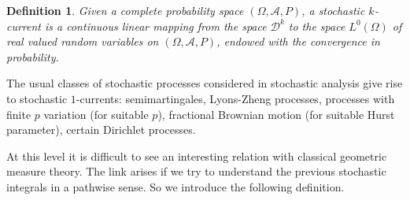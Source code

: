 \documentclass{article}
\newtheorem{definition}[theorem]{Definition}
\begin{document}
\begin{definition}
Given a complete probability space $\left( \Omega ,\mathcal{A},P\right) $, a
stochastic $k$-current is a continuous linear mapping from the space $%
\mathcal{D}^{k}$ to the space $L^{0}\left( \Omega \right) $ of real valued
random variables on $\left( \Omega ,\mathcal{A},P\right) $, endowed with the
convergence in probability.
\end{definition}

The usual classes of stochastic processes considered in stochastic analysis
give rise to stochastic $1$-currents: semimartingales, Lyons-Zheng
processes, processes with finite $p$ variation (for suitable $p$),
fractional Brownian motion (for suitable Hurst parameter), certain Dirichlet
processes.

At this level it is difficult to see an interesting relation with classical
geometric measure theory. The link arises if we try to understand the
previous stochastic integrals in a pathwise sense. So we introduce the
following definition.
\end{document}
